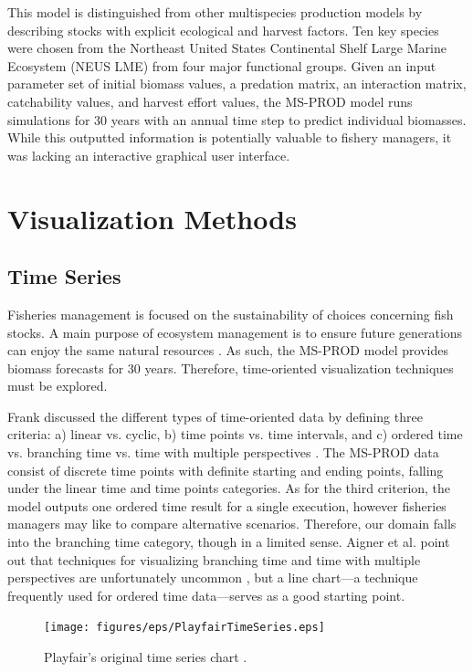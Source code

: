 This model is distinguished from other multispecies production models by describing stocks with explicit ecological and harvest factors.  Ten key species were chosen from the Northeast United States Continental Shelf Large Marine Ecosystem (NEUS LME) from four major functional groups.  Given an input parameter set of initial biomass values, a predation matrix, an interaction matrix, catchability values, and harvest effort values, the MS-PROD model runs simulations for 30 years with an annual time step to predict individual biomasses.  While this outputted information is potentially valuable to fishery managers, it was lacking an interactive graphical user interface.  

\section{Visualization Methods}

\subsection{Time Series}

Fisheries management is focused on the sustainability of choices concerning fish stocks.  A main purpose of ecosystem management is to ensure future generations can enjoy the same natural resources \cite{christensen1996}.  As such, the MS-PROD model provides biomass forecasts for 30 years.  Therefore, time-oriented visualization techniques must be explored.

Frank discussed the different types of time-oriented data by defining three criteria: a) linear vs. cyclic, b) time points vs. time intervals, and c) ordered time vs. branching time vs. time with multiple perspectives \cite{frank1998}.  The MS-PROD data consist of discrete time points with definite starting and ending points, falling under the linear time and time points categories.  As for the third criterion, the model outputs one ordered time result for a single execution, however fisheries managers may like to compare alternative scenarios.  Therefore, our domain falls into the branching time category, though in a limited sense.  Aigner et al. point out that techniques for visualizing branching time and time with multiple perspectives are unfortunately uncommon \cite{aigner2008}, but a line chart---a technique frequently used for ordered time data---serves as a good starting point.

\begin{figure}[h]
	\centering
	\texttt{[image: figures/eps/PlayfairTimeSeries.eps]}
	\caption{Playfair's original time series chart \cite{playfair}.}
	\label{fig:playfair}
\end{figure}

